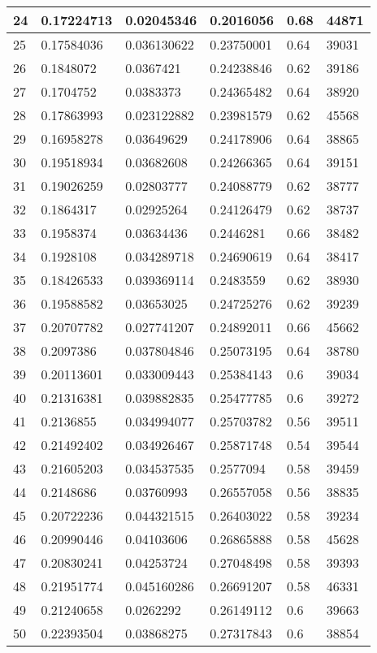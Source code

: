 \begin{longtable}{|l|l|l|l|l|l|}
24 & 0.17224713 & 0.02045346 & 0.2016056 & 0.68 & 44871 \\ \hline 
25 & 0.17584036 & 0.036130622 & 0.23750001 & 0.64 & 39031 \\ \hline 
26 & 0.1848072 & 0.0367421 & 0.24238846 & 0.62 & 39186 \\ \hline 
27 & 0.1704752 & 0.0383373 & 0.24365482 & 0.64 & 38920 \\ \hline 
28 & 0.17863993 & 0.023122882 & 0.23981579 & 0.62 & 45568 \\ \hline 
29 & 0.16958278 & 0.03649629 & 0.24178906 & 0.64 & 38865 \\ \hline 
30 & 0.19518934 & 0.03682608 & 0.24266365 & 0.64 & 39151 \\ \hline 
31 & 0.19026259 & 0.02803777 & 0.24088779 & 0.62 & 38777 \\ \hline 
32 & 0.1864317 & 0.02925264 & 0.24126479 & 0.62 & 38737 \\ \hline 
33 & 0.1958374 & 0.03634436 & 0.2446281 & 0.66 & 38482 \\ \hline 
34 & 0.1928108 & 0.034289718 & 0.24690619 & 0.64 & 38417 \\ \hline 
35 & 0.18426533 & 0.039369114 & 0.2483559 & 0.62 & 38930 \\ \hline 
36 & 0.19588582 & 0.03653025 & 0.24725276 & 0.62 & 39239 \\ \hline 
37 & 0.20707782 & 0.027741207 & 0.24892011 & 0.66 & 45662 \\ \hline 
38 & 0.2097386 & 0.037804846 & 0.25073195 & 0.64 & 38780 \\ \hline 
39 & 0.20113601 & 0.033009443 & 0.25384143 & 0.6 & 39034 \\ \hline 
40 & 0.21316381 & 0.039882835 & 0.25477785 & 0.6 & 39272 \\ \hline 
41 & 0.2136855 & 0.034994077 & 0.25703782 & 0.56 & 39511 \\ \hline 
42 & 0.21492402 & 0.034926467 & 0.25871748 & 0.54 & 39544 \\ \hline 
43 & 0.21605203 & 0.034537535 & 0.2577094 & 0.58 & 39459 \\ \hline 
44 & 0.2148686 & 0.03760993 & 0.26557058 & 0.56 & 38835 \\ \hline 
45 & 0.20722236 & 0.044321515 & 0.26403022 & 0.58 & 39234 \\ \hline 
46 & 0.20990446 & 0.04103606 & 0.26865888 & 0.58 & 45628 \\ \hline 
47 & 0.20830241 & 0.04253724 & 0.27048498 & 0.58 & 39393 \\ \hline 
48 & 0.21951774 & 0.045160286 & 0.26691207 & 0.58 & 46331 \\ \hline 
49 & 0.21240658 & 0.0262292 & 0.26149112 & 0.6 & 39663 \\ \hline 
50 & 0.22393504 & 0.03868275 & 0.27317843 & 0.6 & 38854 \\ \hline 
\end{longtable}